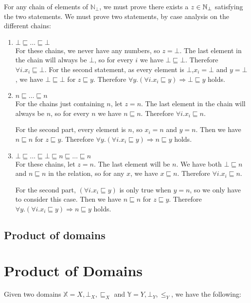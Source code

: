 \begin{enumerate}
{For any chain of elements of $\mathbb{N}_\bot$, we must prove there exists a $z \in \mathbb{N}_{\bot}$ satisfying the two statements. We must prove two statements, by case analysis on the different chains:

\begin{enumerate}
\item{$\bot \sqsubseteq \dots \sqsubseteq \bot$\\ 
For these chains, we never have any numbers, so $z = \bot$. The last element in the chain will always be $\bot$, so for every $i$ we have $\bot \sqsubseteq \bot$. Therefore $\forall i . x_i \sqsubseteq \bot$.
For the second statement, as every element is $\bot$,$x_i = \bot$ and $y = \bot$, we have $\bot \sqsubseteq \bot$ for $z \sqsubseteq y$. Therefore $\forall y. (\forall i . x_i \sqsubseteq y) \Rightarrow \bot \sqsubseteq y$ holds.}
\item{$n \sqsubseteq \dots \sqsubseteq n$ \\
 For the chains just containing $n$, let $z = n$. The last element in the chain will always be $n$, so for every $n$ we have $n \sqsubseteq n$. Therefore $\forall i . x_i \sqsubseteq n$.

For the second part, every element is $n$, so $x_i = n$ and $y = n$. Then we have $n \sqsubseteq n$ for $z \sqsubseteq y$. Therefore $\forall y. (\forall i . x_i \sqsubseteq y) \Rightarrow n \sqsubseteq y$ holds.}
\item{$\bot \sqsubseteq \dots \sqsubseteq \bot \sqsubseteq n \sqsubseteq \dots \sqsubseteq n$\\
For these chains, let $z = n$.  The last element will be $n$. We have both $\bot \sqsubseteq n$ and $n \sqsubseteq n$ in the relation, so for any $x$, we have $x \sqsubseteq n$. Therefore $\forall i . x_i \sqsubseteq n$.

For the second part, $(\forall i . x_i \sqsubseteq y)$ is only true when $y = n$, so we only have to consider this case. Then we have $n \sqsubseteq n$ for $z \sqsubseteq y$. Therefore $\forall y. (\forall i . x_i \sqsubseteq y) \Rightarrow n \sqsubseteq y$ holds.}
\end{enumerate}}
\end{enumerate}

\subsection{Product of domains}
\section{Product of Domains}
Given two domains $\mathbb{X} = X, \bot_X, \sqsubseteq_X$ and $\mathbb{Y} = Y, \bot_Y, \leq_Y$, we have the following:

